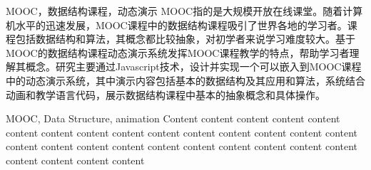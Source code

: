 \begin{abstractzh}{MOOC，数据结构课程，动态演示}
MOOC指的是大规模开放在线课堂。随着计算机水平的迅速发展，MOOC课程中的数据结构课程吸引了世界各地的学习者。课程包括数据结构和算法，其概念都比较抽象，对初学者来说学习难度较大。基于MOOC的数据结构课程动态演示系统发挥MOOC课程教学的特点，帮助学习者理解其概念。研究主要通过Javascript技术，设计并实现一个可以嵌入到MOOC课程中的动态演示系统，其中演示内容包括基本的数据结构及其应用和算法，系统结合动画和教学语言代码，展示数据结构课程中基本的抽象概念和具体操作。
\end{abstractzh}

\begin{abstracten}{MOOC, Data Structure, animation}
Content content content content content content content content content content content content content content content content content content content content content content content content content content content content content
\end{abstracten}

